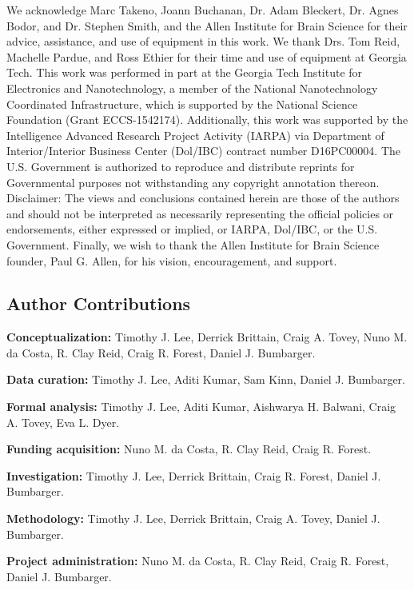 \documentclass{article}
\begin{document}
We acknowledge Marc Takeno, Joann Buchanan, Dr. Adam Bleckert, Dr. Agnes Bodor, and Dr. Stephen Smith, and the Allen Institute for Brain Science for their advice, assistance, and use of equipment in this work. We thank Drs. Tom Reid, Machelle Pardue, and Ross Ethier for their time and use of equipment at Georgia Tech. This work was performed in part at the Georgia Tech Institute for Electronics and Nanotechnology, a member of the National Nanotechnology Coordinated Infrastructure, which is supported by the National Science Foundation (Grant ECCS-1542174). Additionally, this work was supported by the Intelligence Advanced Research Project Activity (IARPA) via Department of Interior/Interior Business Center (Dol/IBC) contract number D16PC00004. The U.S. Government is authorized to reproduce and distribute reprints for Governmental purposes not withstanding any copyright annotation thereon. Disclaimer: The views and conclusions contained herein are those of the authors and should not be interpreted as necessarily representing the official policies or endorsements, either expressed or implied, or IARPA, Dol/IBC, or the U.S. Government. Finally, we wish to thank the Allen Institute for Brain Science founder, Paul G. Allen, for his vision, encouragement, and support.

\subsection*{Author Contributions}

\noindent\textbf{Conceptualization:} Timothy J. Lee, Derrick Brittain, Craig A. Tovey, Nuno M. da Costa, R. Clay Reid, Craig R. Forest, Daniel J. Bumbarger.

\noindent\textbf{Data curation:} Timothy J. Lee, Aditi Kumar, Sam Kinn, Daniel J. Bumbarger.

\noindent\textbf{Formal analysis:} Timothy J. Lee, Aditi Kumar, Aishwarya H. Balwani, Craig A. Tovey, Eva L. Dyer.

\noindent\textbf{Funding acquisition:} Nuno M. da Costa, R. Clay Reid, Craig R. Forest.

\noindent\textbf{Investigation:} Timothy J. Lee, Derrick Brittain, Craig R. Forest, Daniel J. Bumbarger.

\noindent\textbf{Methodology:} Timothy J. Lee, Derrick Brittain, Craig A. Tovey, Daniel J. Bumbarger.

\noindent\textbf{Project administration:} Nuno M. da Costa, R. Clay Reid, Craig R. Forest, Daniel J. Bumbarger.
\end{document}
